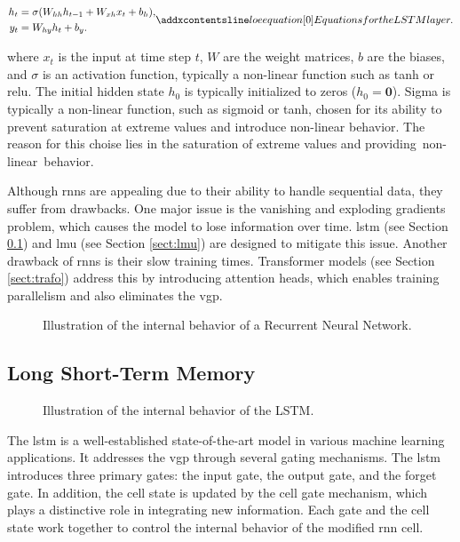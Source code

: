 \begin{equation}
\begin{aligned}
    h_t &= \sigma(W_{hh} h_{t-1} + W_{xh} x_t + b_h), \\
    y_t &= W_{hy} h_t + b_y.
\end{aligned}
\setequationentry{Equations for the LSTM layer.}
\label{eq:lstm_layer}
\end{equation}

where \( x_t \) is the input at time step \( t \), \( W \) are the weight matrices, \( b \) are the biases, and \( \sigma \) is an activation function, typically a non-linear function such as \gls{tanh} or \gls{relu}. The initial hidden state \( h_0 \) is typically initialized to zeros (\( h_0 = \mathbf{0} \)). Sigma is typically a non-linear function, such as sigmoid or \gls{tanh}, chosen for its ability to prevent saturation at extreme values and introduce non-linear behavior. The reason for this choise lies in the saturation of extreme values and providing~non-linear~behavior. 

Although \glspl{rnn} are appealing due to their ability to handle sequential data, they suffer from drawbacks. One major issue is the vanishing and exploding gradients problem, which causes the model to lose information over time. \gls{lstm} (see Section \ref{sect:lstm}) and \gls{lmu} (see Section \ref{sect:lmu}) are designed to mitigate this issue. Another drawback of \glspl{rnn} is their slow training times. Transformer models (see Section \ref{sect:trafo}) address this by introducing attention heads, which enables training parallelism and also eliminates the \gls{vgp}.

\begin{figure}[t]
    \centering
    
    \caption{Illustration of the internal behavior of a Recurrent Neural Network.}
    \label{fig:rnn}
\end{figure}

\subsection{Long Short-Term Memory}
\label{sect:lstm}
\begin{figure}[t]
    \centering
    
    \caption{Illustration of the internal behavior of the LSTM.}
    \label{fig:lstm}
\end{figure}
The \gls{lstm} is a well-established state-of-the-art model in various machine learning applications. It addresses the \gls{vgp} through several gating mechanisms. The \gls{lstm} introduces three primary gates: the input gate, the output gate, and the forget gate. In addition, the cell state is updated by the cell gate mechanism, which plays a distinctive role in integrating new information. Each gate and the cell state work together to control the internal behavior of the modified \gls{rnn} cell. 

